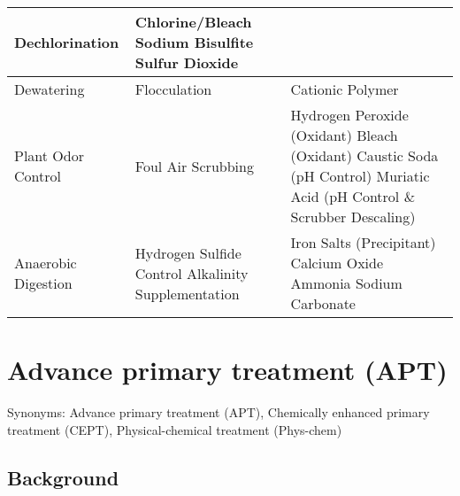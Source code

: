 \begin{tabular}{ |p{4cm}|p{4.5cm}|p{6.5cm}|  }
Dechlorination & Chlorine/Bleach \newline Sodium Bisulfite  \newline Sulfur Dioxide   \\
\hline
Dewatering & Flocculation & Cationic Polymer \\
\hline
Plant Odor Control & Foul Air Scrubbing & Hydrogen Peroxide (Oxidant) \newline Bleach (Oxidant) \newline Caustic Soda (pH Control) \newline Muriatic Acid (pH Control \& Scrubber Descaling)\\
\hline
Anaerobic Digestion & Hydrogen Sulfide Control \newline Alkalinity Supplementation & Iron Salts (Precipitant) \newline Calcium Oxide \newline Ammonia \newline Sodium Carbonate \\
\hline
\end{tabular}

\section{Advance primary treatment (APT)}
Synonyms:  Advance primary treatment (APT), Chemically enhanced primary treatment (CEPT), Physical-chemical treatment (Phys-chem)
\subsection{Background}     
      
